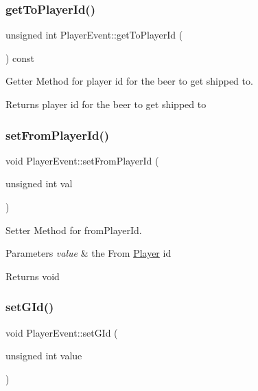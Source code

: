 \subsubsection{\texorpdfstring{get\+To\+Player\+Id()}{getToPlayerId()}}
{\footnotesize\ttfamily unsigned int Player\+Event\+::get\+To\+Player\+Id (\begin{DoxyParamCaption}{ }\end{DoxyParamCaption}) const}



Getter Method for player id for the beer to get shipped to. 

\begin{DoxyReturn}{Returns}
player id for the beer to get shipped to 
\end{DoxyReturn}
\mbox{\label{classPlayerEvent_a079ed27776a87240c7ac7700f1090df2}} 
\subsubsection{\texorpdfstring{set\+From\+Player\+Id()}{setFromPlayerId()}}
{\footnotesize\ttfamily void Player\+Event\+::set\+From\+Player\+Id (\begin{DoxyParamCaption}\item[{unsigned int}]{val }\end{DoxyParamCaption})}



Setter Method for from\+Player\+Id. 


\begin{DoxyParams}{Parameters}
{\em value} & the From \hyperlink{classPlayer}{Player} id \\
\hline
\end{DoxyParams}
\begin{DoxyReturn}{Returns}
void 
\end{DoxyReturn}
\mbox{\label{classPlayerEvent_add2e994da90382443c45d533cbffa629}} 
\subsubsection{\texorpdfstring{set\+G\+Id()}{setGId()}}
{\footnotesize\ttfamily void Player\+Event\+::set\+G\+Id (\begin{DoxyParamCaption}\item[{unsigned int}]{value }\end{DoxyParamCaption})}



